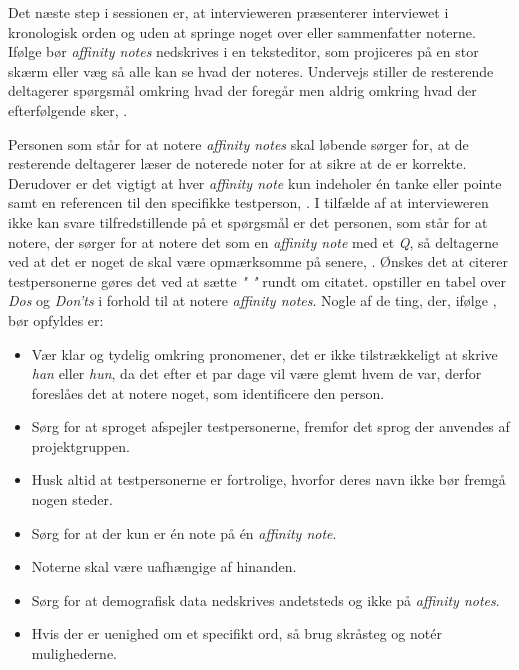 Det næste step i sessionen er, at intervieweren præsenterer interviewet i kronologisk orden og uden at springe noget over eller sammenfatter noterne. Ifølge \textcite[s. 113]{Book:CIInterpretationSession} bør \textit{affinity notes} nedskrives i en teksteditor, som projiceres på en stor skærm eller væg så alle kan se hvad der noteres. Undervejs stiller de resterende deltagerer spørgsmål omkring hvad der foregår men aldrig omkring hvad der efterfølgende sker, \parencite[s. 114]{Book:CIInterpretationSession}.

Personen som står for at notere \textit{affinity notes} skal løbende sørger for, at de resterende deltagerer læser de noterede noter for at sikre at de er korrekte. Derudover er det vigtigt at hver \textit{affinity note} kun indeholer én tanke eller pointe samt en referencen til den specifikke testperson, \parencite[s. 115]{Book:CIInterpretationSession}. I tilfælde af at intervieweren ikke kan svare tilfredstillende på et spørgsmål er det personen, som står for at notere, der sørger for at notere det som en \textit{affinity note} med et \textit{Q}, så deltagerne ved at det er noget de skal være opmærksomme på senere, \parencite[s. 115]{Book:CIInterpretationSession}. Ønskes det at citerer testpersonerne gøres det ved at sætte \textit{" "} rundt om citatet. \textcite[s. 116]{Book:CIInterpretationSession} opstiller en tabel over \textit{Dos} og \textit{Don'ts} i forhold til at notere \textit{affinity notes}. Nogle af de ting, der, ifølge \textcite[s. 116]{Book:CIInterpretationSession}, bør opfyldes er:\blankline
%
\begin{itemize}
  \item Vær klar og tydelig omkring pronomener, det er ikke tilstrækkeligt at skrive \textit{han} eller \textit{hun}, da det efter et par dage vil være glemt hvem de var, derfor foreslåes det at notere noget, som identificere den person.
  \item Sørg for at sproget afspejler testpersonerne, fremfor det sprog der anvendes af projektgruppen.
  \item  Husk altid at testpersonerne er fortrolige, hvorfor deres navn ikke bør fremgå nogen steder. 
  \item Sørg for at der kun er én note på én \textit{affinity note}.
  \item Noterne skal være uafhængige af hinanden. 
  \item Sørg for at demografisk data nedskrives andetsteds og ikke på \textit{affinity notes}. 
  \item Hvis der er uenighed om et specifikt ord, så brug skråsteg og notér mulighederne.\blankline
\end{itemize}

